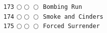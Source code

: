 \documentclass[a4paper,landscape]{article}
\begin{document}
\begin{multicols*}{5}
\texttt{173} \(\bigcirc\!\bigcirc\!\bigcirc\)  \texttt{Bombing Run} \vspace{-0.3mm}\\ 
\texttt{174} \(\bigcirc\!\bigcirc\!\bigcirc\)  \texttt{Smoke and Cinders} \vspace{-0.3mm}\\ 
\texttt{175} \(\bigcirc\!\bigcirc\!\bigcirc\)  \texttt{Forced Surrender} \vspace{-0.3mm}\\ 

\end{multicols*}
\end{document}
